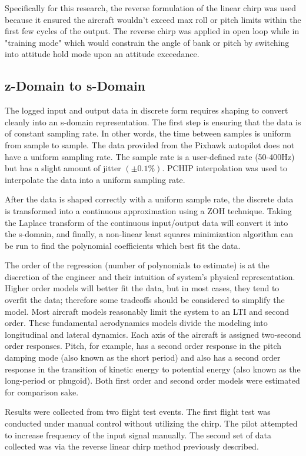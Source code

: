 Specifically for this research, the reverse formulation of the linear chirp was used because it ensured the aircraft wouldn't exceed max roll or pitch limits within the first few cycles of the output.  The reverse chirp was applied in open loop while in "training mode"  which would constrain the angle of bank or pitch by switching into attitude hold mode upon an attitude exceedance.

\subsection{z-Domain to s-Domain}
The logged input and output data in discrete form requires shaping to convert cleanly into an s-domain representation.  The first step is ensuring that the data is of constant sampling rate.  In other words, the time between samples is uniform from sample to sample.  The data provided from the Pixhawk autopilot does not have a uniform sampling rate.  The sample rate is a user-defined rate (50-400Hz) but has a slight amount of jitter $(\pm 0.1\%)$.  \ac{PCHIP} interpolation was used to interpolate the data into a uniform sampling rate.

After the data is shaped correctly with a uniform sample rate, the discrete data is transformed into a continuous approximation using a \ac{ZOH} technique.  Taking the Laplace transform of the continuous input/output data will convert it into the s-domain, and finally, a non-linear least squares minimization algorithm can be run to find the polynomial coefficients which best fit the data.

The order of the regression (number of polynomials to estimate) is at the discretion of the engineer and their intuition of system's physical representation.  Higher order models will better fit the data, but in most cases, they tend to overfit the data; therefore some tradeoffs should be considered to simplify the model.  Most aircraft models reasonably limit the system to an \ac{LTI} and second order.  These fundamental aerodynamics models divide the modeling into longitudinal and lateral dynamics.  Each axis of the aircraft is assigned two-second order responses.  Pitch, for example, has a second order response in the pitch damping mode (also known as the short period) and also has a second order response in the transition of kinetic energy to potential energy (also known as the long-period or phugoid).  Both first order and second order models were estimated for comparison sake.

Results were collected from two flight test events.  The first flight test was conducted under manual control without utilizing the chirp.  The pilot attempted to increase frequency of the input signal manually.  The second set of data collected was via the reverse linear chirp method previously described.  

